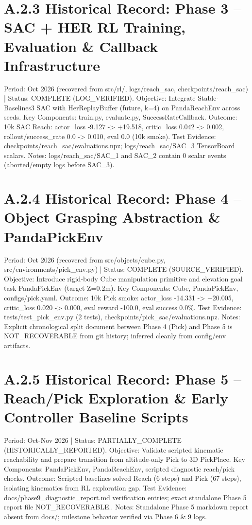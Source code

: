 \documentclass[11pt,a4paper,oneside]{book}
\begin{document}
\section{A.2.3 Historical Record: Phase 3 -- SAC + HER RL Training, Evaluation \& Callback Infrastructure}
Period: Oct 2026 (recovered from src/rl/, logs/reach\_sac, checkpoints/reach\_sac) | Status: COMPLETE (LOG\_VERIFIED). Objective: Integrate Stable-Baselines3 SAC with HerReplayBuffer (future, k=4) on PandaReachEnv across seeds. Key Components: train.py, evaluate.py, SuccessRateCallback. Outcome: 10k SAC Reach: actor\_loss -9.127 -> +19.518, critic\_loss 0.042 -> 0.002, rollout/success\_rate 0.0 -> 0.010, eval 0.0 (10k smoke). Test Evidence: checkpoints/reach\_sac/evaluations.npz; logs/reach\_sac/SAC\_3 TensorBoard scalars. Notes: logs/reach\_sac/SAC\_1 and SAC\_2 contain 0 scalar events (aborted/empty logs before SAC\_3).

\section{A.2.4 Historical Record: Phase 4 -- Object Grasping Abstraction \& PandaPickEnv}
Period: Oct 2026 (recovered from src/objects/cube.py, src/environments/pick\_env.py) | Status: COMPLETE (SOURCE\_VERIFIED). Objective: Introduce rigid-body Cube manipulation primitive and elevation goal task PandaPickEnv (target Z=0.2m). Key Components: Cube, PandaPickEnv, configs/pick.yaml. Outcome: 10k Pick smoke: actor\_loss -14.331 -> +20.005, critic\_loss 0.020 -> 0.000, eval reward -100.0, eval success 0.0\%. Test Evidence: tests/test\_pick\_env.py (2 tests), checkpoints/pick\_sac/evaluations.npz. Notes: Explicit chronological split document between Phase 4 (Pick) and Phase 5 is NOT\_RECOVERABLE from git history; inferred cleanly from config/env artifacts.

\section{A.2.5 Historical Record: Phase 5 -- Reach/Pick Exploration \& Early Controller Baseline Scripts}
Period: Oct-Nov 2026 | Status: PARTIALLY\_COMPLETE (HISTORICALLY\_REPORTED). Objective: Validate scripted kinematic reachability and prepare transition from altitude-only Pick to 3D PickPlace. Key Components: PandaPickEnv, PandaReachEnv, scripted diagnostic reach/pick checks. Outcome: Scripted baselines solved Reach (6 steps) and Pick (67 steps), isolating kinematics from RL exploration gap. Test Evidence: docs/phase9\_diagnostic\_report.md verification entries; exact standalone Phase 5 report file NOT\_RECOVERABLE.. Notes: Standalone Phase 5 markdown report absent from docs/; milestone behavior verified via Phase 6 \& 9 logs.
\end{document}
